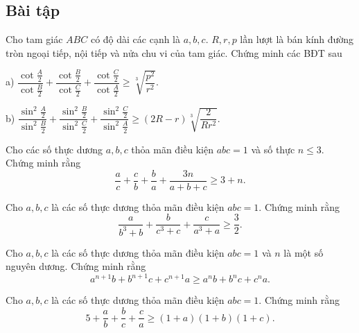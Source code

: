 {\begin{bt}
\end{bt}

\subsection{Bài tập}

\setcounter{bt}{0}
\begin{bt}%
	Cho tam giác $ABC$ có độ dài các cạnh là $a, b, c$. $R, r, p$ lần lượt là bán kính đường tròn ngoại tiếp, nội tiếp và nửa chu vi của tam giác. Chứng minh các BĐT sau
	
	\noindent
	a) $\dfrac{{\cot \frac{A}{2}}}{{\cot \frac{B}{2}}} + \dfrac{{\cot \frac{B}{2}}}{{\cot \frac{C}{2}}} + \dfrac{{\cot \frac{C}{2}}}{{\cot \frac{A}{2}}} \ge \sqrt[3]{{\dfrac{{{p^2}}}{{{r^2}}}}}.$ 
	
	\noindent
	b) $\dfrac{{{{\sin }^2}\frac{A}{2}}}{{{{\sin }^2}\frac{B}{2}}} + \dfrac{{{{\sin }^2}\frac{B}{2}}}{{{{\sin }^2}\frac{C}{2}}} + \dfrac{{{{\sin }^2}\frac{C}{2}}}{{{{\sin }^2}\frac{A}{2}}} \ge \left( {2R - r} \right)\sqrt[3]{{\dfrac{2}{{Rr{}^2}}}}.$
\end{bt}

\begin{bt}%
	Cho các số thực dương $a, b, c$ thỏa mãn điều kiện $abc = 1$ và số thực $n \le 3$. Chứng minh rằng
	$$\frac{a}{c} + \frac{c}{b} + \frac{b}{a} + \frac{{3n}}{{a + b + c}} \ge 3 + n.$$
\end{bt}

\begin{bt}%
	Cho $a, b, c$ là các số thực dương thỏa mãn điều kiện $abc = 1$. Chứng minh rằng
	$$\frac{a}{{{b^3} + b}} + \frac{b}{{{c^3} + c}} + \frac{c}{{{a^3} + a}} \ge \frac{3}{2}.$$
\end{bt}

\begin{bt}%
	Cho $a, b, c$ là các số thực dương thỏa mãn điều kiện $abc = 1$ và $n$ là một số nguyên dương. Chứng minh rằng
	$$ {a^{n + 1}}b + {b^{n + 1}}c + {c^{n + 1}}a \ge {a^n}b + {b^n}c + {c^n}a. $$
\end{bt}

\begin{bt}%
	Cho $a, b, c$ là các số thực dương thỏa mãn điều kiện $abc = 1$. Chứng minh rằng
	$$ 5 + \frac{a}{b} + \frac{b}{c} + \frac{c}{a} \ge \left( {1 + a} \right)\left( {1 + b} \right)\left( {1 + c} \right).  $$
\end{bt}

}
